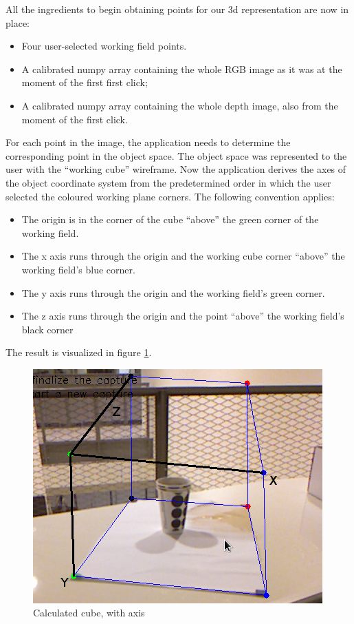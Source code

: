 All the ingredients to begin obtaining points for our 3d representation are now
in place:
\begin{itemize}

\item Four user-selected working field points.

\item A calibrated numpy array containing the whole RGB image as it was at the
moment of the first first click;

\item A calibrated numpy array containing the whole depth image, also from the
moment of the first click.

\end{itemize}

For each point in the image, the application needs to determine the
corresponding point in the object space. The object space was represented to the
user with the ``working cube'' wireframe. Now the application derives the axes
of the object coordinate system from the predetermined order in which the user
selected the coloured working plane corners. The following convention applies:
\begin{itemize}

\item The origin is in the corner of the cube ``above'' the green corner of the
working field.

\item The x axis runs through the origin and the working cube corner ``above'' the
working field's blue corner.

\item The y axis runs through the origin and the working field's green corner.

\item The z axis runs through the origin and the point ``above'' the working
field's black corner

\end{itemize}

The result is visualized in figure \ref{fig:axis}. \\

\begin{figure}[H]
\centering
\includegraphics[scale=0.5]{images/axis.png}
\caption{Calculated cube, with axis}
\label{fig:axis}
\end{figure}


